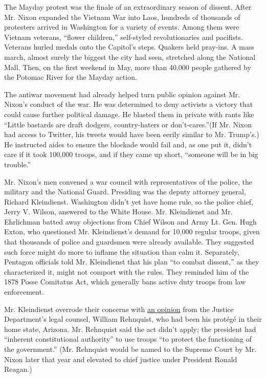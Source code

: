 The Mayday protest was the finale of an extraordinary season of dissent.
After Mr. Nixon expanded the Vietnam War into Laos, hundreds of
thousands of protesters arrived in Washington for a variety of events.
Among them were Vietnam veterans, ``flower children,'' self-styled
revolutionaries and pacifists. Veterans hurled medals onto the Capitol's
steps. Quakers held pray-ins. A mass march, almost surely the biggest
the city had seen, stretched along the National Mall. Then, on the first
weekend in May, more than 40,000 people gathered by the Potomac River
for the Mayday action.

The antiwar movement had already helped turn public opinion against Mr.
Nixon's conduct of the war. He was determined to deny activists a
victory that could cause further political damage. He blasted them in
private with rants like ``Little bastards are draft dodgers,
country-haters or don't-cares.''(If Mr. Nixon had access to Twitter, his
tweets would have been eerily similar to Mr. Trump's.) He instructed
aides to ensure the blockade would fail and, as one put it, didn't care
if it took 100,000 troops, and if they came up short, ``someone will be
in big trouble.''

Mr. Nixon's men convened a war council with representatives of the
police, the military and the National Guard. Presiding was the deputy
attorney general, Richard Kleindienst. Washington didn't yet have home
rule, so the police chief, Jerry V. Wilson, answered to the White House.
Mr. Kleindienst and Mr. Ehrlichman batted away objections from Chief
Wilson and Army Lt. Gen. Hugh Exton, who questioned Mr. Kleindienst's
demand for 10,000 regular troops, given that thousands of police and
guardsmen were already available. They suggested such force might do
more to inflame the situation than calm it. Separately, Pentagon
officials told Mr. Kleindienst that his plan ``to combat dissent,'' as
they characterized it, might not comport with the rules. They reminded
him of the 1878 Posse Comitatus Act, which generally bans active duty
troops from law enforcement.

Mr. Kleindienst overrode their concerns with
\href{https://www.justice.gov/file/20836/download}{an opinion} from the
Justice Department's legal counsel, William Rehnquist, who had been his
protégé in their home state, Arizona. Mr. Rehnquist said the act didn't
apply; the president had ``inherent constitutional authority'' to use
troops ``to protect the functioning of the government.'' (Mr. Rehnquist
would be named to the Supreme Court by Mr. Nixon later that year and
elevated to chief justice under President Ronald Reagan.)

